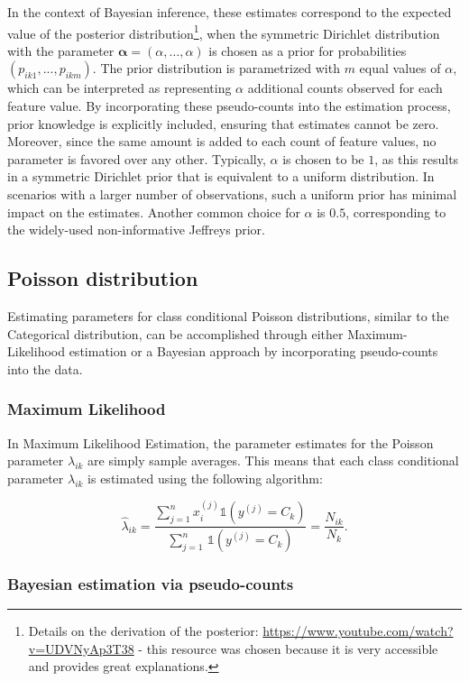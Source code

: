 \documentclass{article}\usepackage[]{graphicx}\usepackage[]{xcolor}
\begin{document}
In the context of Bayesian inference, these estimates correspond to the expected value of the posterior distribution\footnote{Details on the derivation of the posterior: \url{https://www.youtube.com/watch?v=UDVNyAp3T38} - this resource was chosen because it is very accessible and provides great explanations.}, when the symmetric Dirichlet distribution with the parameter $\boldsymbol{\alpha} = (\alpha,\ldots,\alpha)$ is chosen as a prior for probabilities $(p_{ik1}, ..., p_{ikm})$. The prior distribution is parametrized with $m$ equal values of $\alpha$, which can be interpreted as representing $\alpha$ additional counts observed for each feature value. By incorporating these pseudo-counts into the estimation process, prior knowledge is explicitly included, ensuring that estimates cannot be zero. Moreover, since the same amount is added to each count of feature values, no parameter is favored over any other. Typically, $\alpha$ is chosen to be $1$, as this results in a symmetric Dirichlet prior that is equivalent to a uniform distribution. In scenarios with a larger number of observations, such a uniform prior has minimal impact on the estimates. Another common choice for $\alpha$ is $0.5$, corresponding to the widely-used non-informative Jeffreys prior.

\subsection{Poisson distribution}

Estimating parameters for class conditional Poisson distributions, similar to the Categorical distribution, can be accomplished through either Maximum-Likelihood estimation or a Bayesian approach by incorporating pseudo-counts into the data.

\subsubsection{Maximum Likelihood}

In Maximum Likelihood Estimation, the parameter estimates for the Poisson parameter $\lambda_{ik}$ are simply sample averages. This means that each class conditional parameter $\lambda_{ik}$ is estimated using the following algorithm:

$$\hat{\lambda}_{ik} = \frac{\sum_{j=1}^n x_i^{(j)} \mathbb{1}(y^{(j)} = C_k) }{\sum_{j=1}^n \, \mathbb{1}(y^{(j)} = C_k)} = \frac{N_{ik}}{N_k}.$$


\subsubsection{Bayesian estimation via pseudo-counts}
\end{document}
